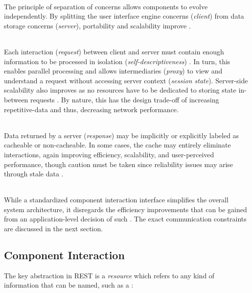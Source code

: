 \begin{appendices}
\begin{description}[format={\storedescriptionlabel}]
	\item[Client-Server]
	\hfill \\
	The principle of separation of concerns allows components to evolve independently. By splitting the user interface engine concerns (\textit{client}) from data storage concerns (\textit{server}), portability and scalability improve \cite[p.~78]{fielding2000architectural}.
	\item[Stateless]
	\hfill \\
	Each interaction (\textit{request}) between client and server must contain enough information to be processed in isolation (\textit{self-descriptiveness}) \cite[pp.~78--79]{fielding2000architectural}. In turn, this enables parallel processing and allows intermediaries (\textit{proxy}) to view and understand a request without accessing server context (\textit{session state}). Server-side scalability also improves as no resources have to be dedicated to storing state in-between requests \cite[pp.~79, 93]{fielding2000architectural}. By nature, this has the design trade-off of increasing repetitive-data and thus, decreasing network performance.
	\item[Cache]
	\hfill \\
	Data returned by a server (\textit{response}) may be implicitly or explicitly labeled as cacheable or non-cacheable. In some cases, the cache may entirely eliminate interactions, again improving efficiency, scalability, and user-perceived performance, though caution must be taken since reliability issues may arise through stale data \cite[pp.~79--80]{fielding2000architectural}.
	\item[Uniform Interface]
	\hfill \\
	While a standardized component interaction interface simplifies the overall system architecture, it disregards the efficiency improvements that can be gained from an application-level decision of such \cite[pp.~81--82]{fielding2000architectural}. The exact communication constraints are discussed in the next section.
\end{description}


\subsection{Component Interaction}
\label{sec:rest-component-interaction}

The key abstraction in \ac{REST} is a \textit{resource} which refers to any kind of information that can be named, such as a \cite[p.~88]{fielding2000architectural}:


\end{appendices}
